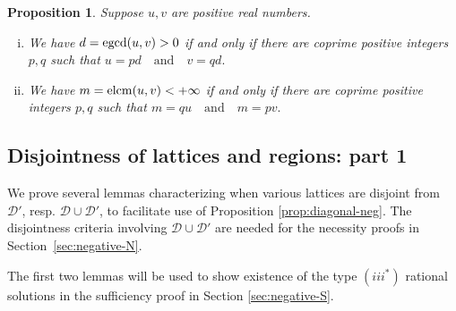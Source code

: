 \documentclass[11pt, letterpaper, reqno]{amsart}
\newtheorem{prop}[thm]{Proposition}
\theoremstyle{definition}
\theoremstyle{remark}
\numberwithin{equation}{section}
\newcommand{\cD}{\mathcal{D}}
\newcommand{\cDprime}{{\mathcal{D}'}}
\newcommand{\egcd}{{\rm egcd}}
\newcommand{\elcm}{{\rm elcm}}
\begin{document}
\begin{prop}
Suppose $u,v$ are positive real numbers.
\begin{enumerate}[(i)]
\item We have $d = \egcd(u,v) > 0$ if and only if there are coprime positive integers $p,q$ such that
$u = pd \quad\text{and}\quad v = qd.$

\item 
We have $m = \elcm(u,v) < +\infty$ if and only if there are coprime positive integers $p,q$ such that
$ m = qu \quad \text{and}\quad m = pv.$

\end{enumerate}
\end{prop}



%
%
\subsection{Disjointness of lattices and regions: part 1}
\label{sec:disjoint}

We prove several lemmas characterizing when various lattices
are disjoint from $\cDprime$, resp. $\cD \cup \cDprime$, 
to facilitate use of Proposition \ref{prop:diagonal-neg}.
The disjointness criteria involving  $\cD \cup \cDprime$  are
needed for the necessity proofs in Section~\ref{sec:negative-N}.


The first two lemmas will be  used
to show  existence of the type $(iii^{\ast})$ 
 rational solutions in  the sufficiency proof in Section \ref{sec:negative-S}.
\end{document}
